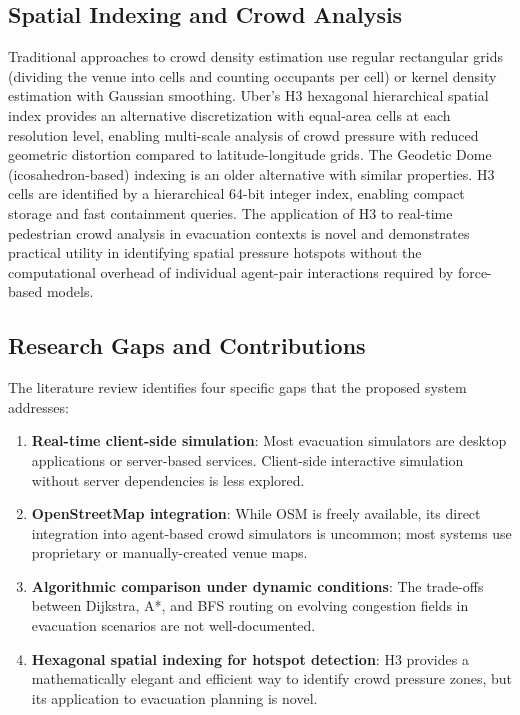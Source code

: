\documentclass[conference]{IEEEtran}
\begin{document}
\subsection{Spatial Indexing and Crowd Analysis}

Traditional approaches to crowd density estimation use regular rectangular grids (dividing the venue into cells and counting occupants per cell) or kernel density estimation with Gaussian smoothing. Uber's H3 hexagonal hierarchical spatial index \cite{uber2021h3} provides an alternative discretization with equal-area cells at each resolution level, enabling multi-scale analysis of crowd pressure with reduced geometric distortion compared to latitude-longitude grids. The Geodetic Dome (icosahedron-based) indexing \cite{sahr2003geodetic} is an older alternative with similar properties. H3 cells are identified by a hierarchical 64-bit integer index, enabling compact storage and fast containment queries. The application of H3 to real-time pedestrian crowd analysis in evacuation contexts is novel and demonstrates practical utility in identifying spatial pressure hotspots without the computational overhead of individual agent-pair interactions required by force-based models.

\subsection{Research Gaps and Contributions}

The literature review identifies four specific gaps that the proposed system addresses:

\begin{enumerate}
\item \textbf{Real-time client-side simulation}: Most evacuation simulators are desktop applications or server-based services. Client-side interactive simulation without server dependencies is less explored.
\item \textbf{OpenStreetMap integration}: While OSM is freely available, its direct integration into agent-based crowd simulators is uncommon; most systems use proprietary or manually-created venue maps.
\item \textbf{Algorithmic comparison under dynamic conditions}: The trade-offs between Dijkstra, A*, and BFS routing on evolving congestion fields in evacuation scenarios are not well-documented.
\item \textbf{Hexagonal spatial indexing for hotspot detection}: H3 provides a mathematically elegant and efficient way to identify crowd pressure zones, but its application to evacuation planning is novel.
\end{enumerate}
\end{document}
